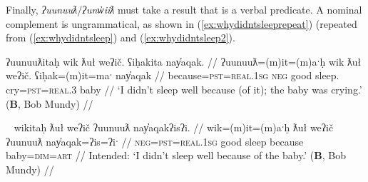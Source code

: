 
Finally, \textit{ʔuunuuƛ}/\textit{ʔunw̓iiƛ} must take a result that is a verbal predicate. A nominal complement is ungrammatical, as shown in (\ref{ex:whydidntsleeprepeat}) (repeated from (\ref{ex:whydidntsleep}) and (\ref{ex:whydidntsleep2}).

\ex \label{ex:whydidntsleeprepeat}
\begingl
\glpreamble ʔuunuuƛitaḥ wik ƛuł weʔič. ʕiḥakita nay̓aqak. //
\gla ʔuunuuƛ=(m)it=(m)aˑḥ wik ƛuł weʔič. ʕiḥak=(m)it=maˑ nay̓aqak //
\glb because=\textsc{pst}=\textsc{real.1sg} \textsc{neg} good sleep. cry=\textsc{pst}=\textsc{real.3} baby //
\glft `I didn't sleep well because (of it); the baby was crying.' (\textbf{B}, Bob Mundy) //
\endgl
\xe

\ex~ \label{ex:whydidntsleep2}
\begingl
\glpreamble *wikitaḥ ƛuł weʔič ʔuunuuƛ nay̓aqakʔisʔi. //
\gla wik=(m)it=(m)aˑḥ ƛuł weʔič ʔuunuuƛ nay̓aqak=ʔis=ʔiˑ //
\glb \textsc{neg}=\textsc{pst}=\textsc{real.1sg} good sleep because baby=\textsc{dim}=\textsc{art} //
\glft Intended: `I didn't sleep well because of the baby.' (\textbf{B}, Bob Mundy) //
\endgl
\xe

\begin{comment}
\ex~ \label{ex:uunuutl4}
\begingl
\glpreamble *hitaʔapweʔin kaatkimqsuptaał t̓an̓eʔisʔi ʔuunuuƛ našuk. //
\gla hitaʔap=weˑʔin kaatkimqsuptaał t̓an̓a=ʔis=ʔiˑ ʔuunuuƛ našuk //
\glb win=\textsc{hrsy.3} race child=\textsc{dim}=\textsc{art} because strong //
\glft Intended: `The kid won the race because he is strong.' (\textbf{B}, Bob Mundy) //
\endgl
\xe

\vspace{5pt}
\end{comment}

\begin{comment}
Becausitives also follow the typical verbal pattern of being able to freely drop arguments, already seen in (\ref{ex:uunuutl1}) and again in (\ref{ex:becausechanged}).

\vspace{5pt}

Context for (\ref{ex:becausechanged}): A retelling of traditional ways of life. This followed an explanation of how this isn't done anymore, and a lengthy pause.

\ex~ \label{ex:becausechanged}
\begingl
\glpreamble ʔunʔuuƛ̓aƛʔał kʷiisḥin. //
\gla ʔunʔuuƛ=!aƛ=ʔał kʷis-L.ḥin //
\glb because=\textsc{now}=\textsc{pl} different-\textsc{dr} //
\glft `Because they're different now.' (\textbf{C}, \textit{tupaat} Julia Lucas) //
\endgl
\xe
\end{comment}

